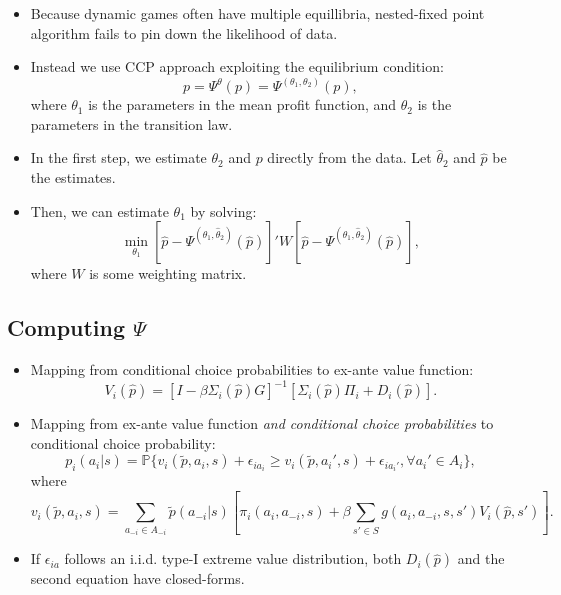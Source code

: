 \documentclass[
]{book}
\providecommand{\tightlist}{%
  \setlength{\itemsep}{0pt}\setlength{\parskip}{0pt}}
\begin{document}
\begin{itemize}
\tightlist
\item
  Because dynamic games often have multiple equillibria, nested-fixed point algorithm fails to pin down the likelihood of data.
\item
  Instead we use CCP approach exploiting the equilibrium condition:
  \begin{equation}
  p = \Psi^\theta(p) = \Psi^{(\theta_1, \theta_2)}(p),
  \end{equation}
  where \(\theta_1\) is the parameters in the mean profit function, and \(\theta_2\) is the parameters in the transition law.
\item
  In the first step, we estimate \(\theta_2\) and \(p\) directly from the data. Let \(\hat{\theta}_2\) and \(\hat{p}\) be the estimates.
\item
  Then, we can estimate \(\theta_1\) by solving:
  \begin{equation}
  \min_{\theta_1} [\hat{p} - \Psi^{(\theta_1, \hat{\theta}_2)}(\hat{p})]' W [\hat{p} - \Psi^{(\theta_1, \hat{\theta}_2)}(\hat{p})],
  \end{equation}
  where \(W\) is some weighting matrix.
\end{itemize}

\hypertarget{computing-psi}{%
\subsection{\texorpdfstring{Computing \(\Psi\)}{Computing \textbackslash Psi}}\label{computing-psi}}

\begin{itemize}
\item
  Mapping from conditional choice probabilities to ex-ante value function:
  \[
  V_i(\hat{p}) = [I - \beta \Sigma_i(\hat{p})G]^{-1} [\Sigma_i(\hat{p})\Pi_i + D_i(\hat{p})].
  \]
\item
  Mapping from ex-ante value function \textit{and conditional choice probabilities} to conditional choice probability:
  \begin{equation}
  p_i(a_i|s) =  \mathbb{P}\{v_i(\tilde{p}, a_i, s) + \epsilon_{ia_i} \ge  v_i(\tilde{p}, a_i', s) + \epsilon_{ia_i'}, \forall a_i' \in A_i\},
  \end{equation}
  where
  \begin{equation}
  v_i(\tilde{p}, a_i, s) = \sum_{a_{-i} \in A_{-i}} \tilde{p}(a_{-i}|s) [\pi_i(a_i, a_{-i}, s) + \beta \sum_{s' \in S} g(a_i, a_{-i}, s, s') V_i(\hat{p}, s')].
  \end{equation}
\item
  If \(\epsilon_{ia}\) follows an i.i.d. type-I extreme value distribution, both \(D_i(\hat{p})\) and the second equation have closed-forms.
\end{itemize}
\end{document}
